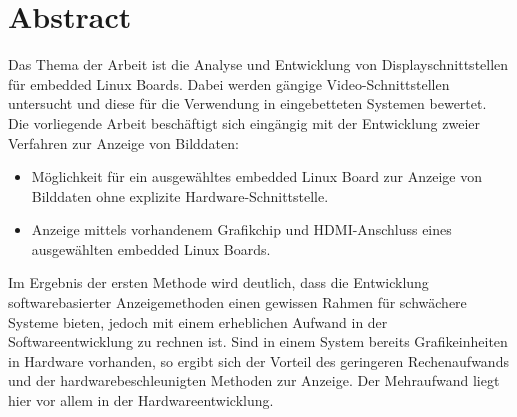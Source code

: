 \section*{Abstract}
\label{sec:Abstract}
Das Thema der Arbeit ist die Analyse und  Entwicklung von Displayschnittstellen für embedded Linux Boards. Dabei werden gängige Video-Schnittstellen untersucht und diese für die Verwendung in eingebetteten Systemen bewertet.\\
Die vorliegende Arbeit beschäftigt sich eingängig mit der Entwicklung zweier Verfahren zur Anzeige von Bilddaten:
\begin{itemize}
\item Möglichkeit für ein ausgewähltes embedded Linux Board zur Anzeige von Bilddaten ohne explizite Hardware-Schnittstelle.
\item Anzeige mittels vorhandenem Grafikchip und HDMI-Anschluss eines ausgewählten embedded Linux Boards.
\end{itemize}
Im Ergebnis der ersten Methode wird deutlich, dass die Entwicklung softwarebasierter Anzeigemethoden einen gewissen Rahmen für schwächere Systeme bieten, jedoch mit einem erheblichen Aufwand in der Softwareentwicklung zu rechnen ist. Sind in einem System bereits Grafikeinheiten in Hardware vorhanden, so ergibt sich der Vorteil des geringeren Rechenaufwands und der hardwarebeschleunigten Methoden zur Anzeige. Der Mehraufwand liegt hier vor allem in der Hardwareentwicklung.
